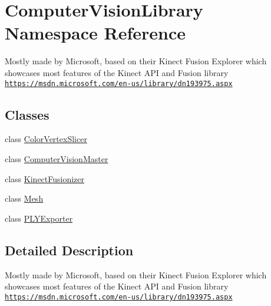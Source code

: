 \hypertarget{namespace_computer_vision_library}{}\section{Computer\+Vision\+Library Namespace Reference}
\label{namespace_computer_vision_library}


Mostly made by Microsoft, based on their Kinect Fusion Explorer which showcases most features of the Kinect A\+PI and Fusion library \href{https://msdn.microsoft.com/en-us/library/dn193975.aspx}{\tt https\+://msdn.\+microsoft.\+com/en-\/us/library/dn193975.\+aspx}  


\subsection*{Classes}
\begin{DoxyCompactItemize}
\item 
class \hyperlink{class_computer_vision_library_1_1_color_vertex_slicer}{Color\+Vertex\+Slicer}
\item 
class \hyperlink{class_computer_vision_library_1_1_computer_vision_master}{Computer\+Vision\+Master}
\item 
class \hyperlink{class_computer_vision_library_1_1_kinect_fusionizer}{Kinect\+Fusionizer}
\item 
class \hyperlink{class_computer_vision_library_1_1_mesh}{Mesh}
\item 
class \hyperlink{class_computer_vision_library_1_1_p_l_y_exporter}{P\+L\+Y\+Exporter}
\end{DoxyCompactItemize}


\subsection{Detailed Description}
Mostly made by Microsoft, based on their Kinect Fusion Explorer which showcases most features of the Kinect A\+PI and Fusion library \href{https://msdn.microsoft.com/en-us/library/dn193975.aspx}{\tt https\+://msdn.\+microsoft.\+com/en-\/us/library/dn193975.\+aspx} 